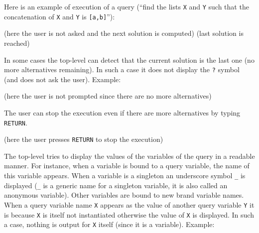 Here is an example of execution of a query (``find the lists \texttt{X} and
\texttt{Y} such that the concatenation of \texttt{X} and \texttt{Y} is
\texttt{[a,b]}''):

\begin{CodeTwoCols}
\SkipLine
{}
\SkipLine
{}
\SkipLine
{}
    {(here the user is not asked and the next solution is
computed)}
\SkipLine
{}
     {(last solution is reached)}
\SkipLine
{}
\end{CodeTwoCols}

In some cases the top-level can detect that the current solution is the last
one (no more alternatives remaining). In such a case it does not display the
\texttt{?} symbol (and does not ask the user). Example:

\begin{CodeTwoCols}
\SkipLine
{}
\SkipLine
{}  {(here the user is not prompted since there are no more
alternatives)}
\SkipLine
{}
\end{CodeTwoCols}

The user can stop the execution even if there are more alternatives by
typing \texttt{RETURN}.

\begin{CodeTwoCols}
\SkipLine
{} {(here the user presses \texttt{RETURN} to stop the execution)}
\SkipLine
{}
\end{CodeTwoCols}

The top-level tries to display the values of the variables of the query in a
readable manner. For instance, when a variable is bound to a query variable,
the name of this variable appears. When a variable is a singleton an
underscore symbol \texttt{\_} is displayed (\texttt{\_} is a generic name
for a singleton variable, it is also called an anonymous variable). Other
variables are bound to new brand variable names. When a query variable name
\texttt{X} appears as the value of another query variable \texttt{Y} it is
because \texttt{X} is itself not instantiated otherwise the value of
\texttt{X} is displayed. In such a case, nothing is output for \texttt{X}
itself (since it is a variable). Example:

